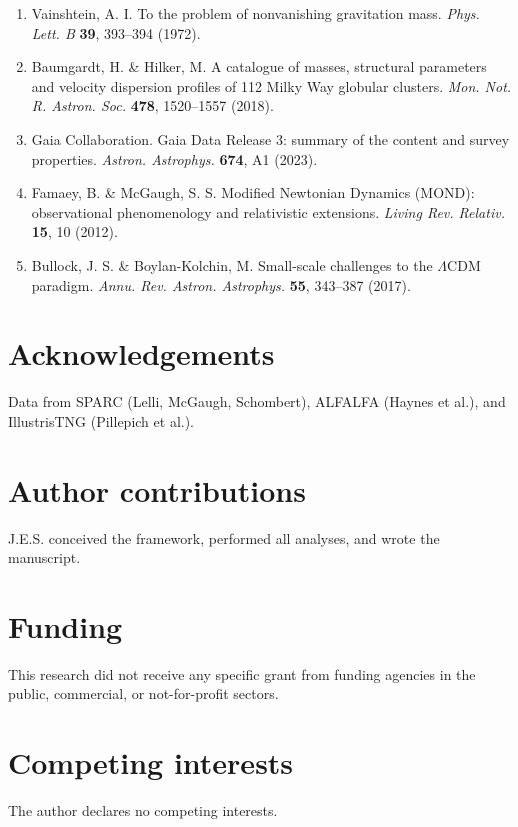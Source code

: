 \documentclass[11pt,a4paper]{article}
\begin{document}
\begin{enumerate}
\item Vainshtein, A. I. To the problem of nonvanishing gravitation mass. \textit{Phys. Lett. B} \textbf{39}, 393--394 (1972).

\item Baumgardt, H. \& Hilker, M. A catalogue of masses, structural parameters and velocity dispersion profiles of 112 Milky Way globular clusters. \textit{Mon. Not. R. Astron. Soc.} \textbf{478}, 1520--1557 (2018).

\item Gaia Collaboration. Gaia Data Release 3: summary of the content and survey properties. \textit{Astron. Astrophys.} \textbf{674}, A1 (2023).

\item Famaey, B. \& McGaugh, S. S. Modified Newtonian Dynamics (MOND): observational phenomenology and relativistic extensions. \textit{Living Rev. Relativ.} \textbf{15}, 10 (2012).

\item Bullock, J. S. \& Boylan-Kolchin, M. Small-scale challenges to the $\Lambda$CDM paradigm. \textit{Annu. Rev. Astron. Astrophys.} \textbf{55}, 343--387 (2017).
\end{enumerate}

\section*{Acknowledgements}
Data from SPARC (Lelli, McGaugh, Schombert), ALFALFA (Haynes et al.), and IllustrisTNG (Pillepich et al.).

\section*{Author contributions}
J.E.S. conceived the framework, performed all analyses, and wrote the manuscript.

\section*{Funding}
This research did not receive any specific grant from funding agencies in the public, commercial, or not-for-profit sectors.

\section*{Competing interests}
The author declares no competing interests.
\end{document}
